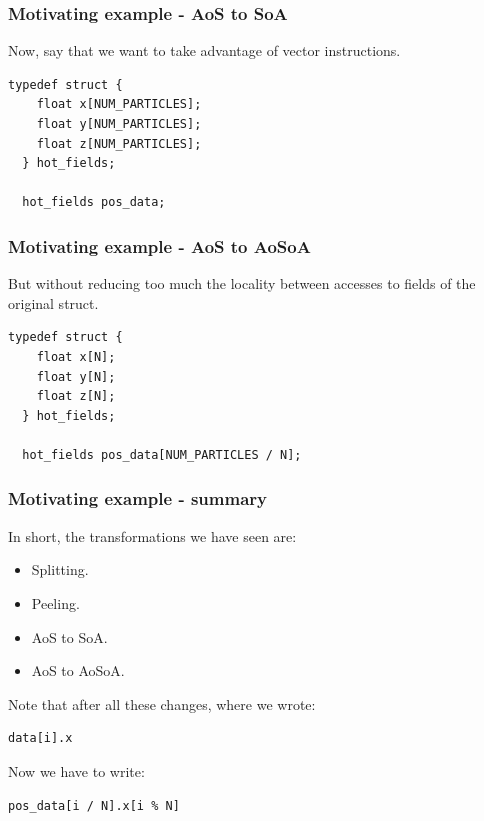 \begin{frame}[fragile]
\frametitle{Motivating example - AoS to SoA}

Now, say that we want to take advantage of vector instructions.

\bigskip

\begin{lstlisting}[style=Cstyle]
  typedef struct {
    float x[NUM_PARTICLES]; 
    float y[NUM_PARTICLES];
    float z[NUM_PARTICLES];
  } hot_fields;

  hot_fields pos_data;
\end{lstlisting}

\end{frame}


\begin{frame}[fragile]
\frametitle{Motivating example - AoS to AoSoA}

But without reducing too much the locality between accesses to fields of the original struct.

\bigskip

\begin{lstlisting}[style=Cstyle]
  typedef struct {
    float x[N]; 
    float y[N];
    float z[N];
  } hot_fields;

  hot_fields pos_data[NUM_PARTICLES / N];
\end{lstlisting}

\end{frame}


\begin{frame}[fragile]
\frametitle{Motivating example - summary}

In short, the transformations we have seen are:
\begin{itemize}
	\item Splitting.
	\item Peeling.
	\item AoS to SoA.
	\item AoS to AoSoA.
\end{itemize}

\bigskip \pause

Note that after all these changes, where we wrote:

\begin{lstlisting}[style=Cstyle]
  data[i].x 
\end{lstlisting}

Now we have to write:

\begin{lstlisting}[style=Cstyle]
  pos_data[i / N].x[i % N]
\end{lstlisting}

\end{frame}


